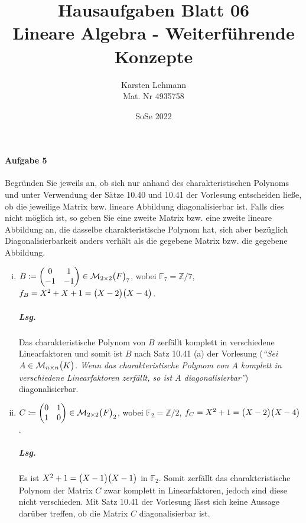 \documentclass{scrreprt}
\author{Karsten Lehmann\\Mat. Nr 4935758}
\date{SoSe 2022}
\title{Hausaufgaben Blatt 06\\Lineare Algebra - Weiterführende Konzepte}
\begin{document}
\paragraph{Aufgabe 5} Begründen Sie jeweils an, ob sich nur anhand des
charakteristischen Polynoms und unter Verwendung der Sätze 10.40 und 10.41
der Vorlesung entscheiden ließe, ob die jeweilige Matrix bzw. lineare
Abbildung diagonalisierbar ist.
Falls dies nicht möglich ist, so geben Sie eine zweite Matrix bzw. eine zweite
lineare Abbildung an, die dasselbe charakteristische Polynom hat, sich aber
bezüglich Diagonalisierbarkeit anders verhält als die gegebene Matrix bzw. die
gegebene Abbildung.

\begin{enumerate}[(i)]
\item $B \coloneqq \begin{pmatrix}
    0 & 1 \\
    -1 & -1 \\
  \end{pmatrix} \in \mathcal{M}_{2 \times 2}\qty\big(F)_7$, wobei
  $\mathbb{F}_7 = \mathbb{Z}/7$,
  $f_B = X^2 + X + 1 = \qty\big(X - 2)\qty\big(X - 4)$.

  \subparagraph{Lsg.} Das charakteristische Polynom von $B$ zerfällt komplett in
  verschiedene Linearfaktoren und somit ist $B$ nach Satz 10.41 (a) der Vorlesung
  (\emph{``Sei $A \in \mathcal{M}_{n \times n}\qty\big(K)$.
    Wenn das charakteristische Polynom von $A$ komplett in verschiedene
    Linearfaktoren zerfällt, so ist $A$ diagonalisierbar''}) diagonalisierbar.

\item $C \coloneqq \begin{pmatrix}
    0 & 1 \\
    1 & 0 \\
  \end{pmatrix} \in \mathcal{M}_{2 \times 2}\qty\big(F)_2$, wobei
  $\mathbb{F}_2 = \mathbb{Z}/2$,
  $f_C = X^2 + 1 = \qty\big(X - 2)\qty\big(X - 4)$.

  \subparagraph{Lsg.} Es ist $X^2 + 1 = \qty\big(X - 1)\qty\big(X - 1)$ in
  $\mathbb{F}_2$.
  Somit zerfällt das charakteristische Polynom der Matrix $C$ zwar komplett
  in Linearfaktoren, jedoch sind diese nicht verschieden.
  Mit Satz 10.41 der Vorlesung lässt sich keine Aussage darüber treffen, ob
  die Matrix $C$ diagonalisierbar ist.


\end{enumerate}
\end{document}
